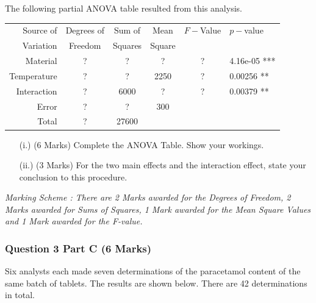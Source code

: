 \documentclass[a4paper,12pt]{article}
\begin{document}
%
\bigskip 


\noindent The following partial ANOVA table resulted from this analysis.
%
\begin{center}
\begin{tabular}{|r||c|c|c|c|l|}\hline
	Source of & Degrees of &Sum of  & Mean &$F-$Value& $p-$value\\
	
	Variation & Freedom  &  Squares & Square&&\\ \hline 
	

Material	&	\phantom{ma} ? \phantom{ma}	&	\phantom{ma} ? \phantom{ma}	&	\phantom{ma} ? \phantom{ma}	&	\phantom{ma} ? \phantom{ma}	&	4.16e-05 ***	\\ \hline
Temperature	&	\phantom{ma} ? \phantom{ma}	&	\phantom{ma} ? \phantom{ma}	&	2250	&	\phantom{ma} ? \phantom{ma}	&	0.00256 **	\\ \hline
Interaction	&	\phantom{ma} ? \phantom{ma}	&	6000	&	\phantom{ma} ? \phantom{ma}	&	\phantom{ma} ? \phantom{ma}	&	0.00379 **	\\ \hline
Error	&	\phantom{ma} ? \phantom{ma}	&	\phantom{ma} ? \phantom{ma}	&	300	&		&	 	\\ \hline \hline
Total	&	\phantom{ma} ? \phantom{ma}	&	27600	&		&		&		\\ \hline

\end{tabular} 
\end{center}
\begin{itemize}
\item[(i.)] (6 Marks) Complete the ANOVA Table. Show your workings.

\item[(ii.)] (3 Marks) For the two main effects and the interaction effect, state your conclusion to this procedure.
\end{itemize}

\bigskip 
\noindent \textit{Marking Scheme : There are 2 Marks awarded for the Degrees of Freedom, 2 Marks awarded for Sums of Squares, 1 Mark awarded for the Mean Square Values and 1 Mark awarded for the F-value.}


\newpage
\subsubsection*{Question 3 Part C (6 Marks)}
Six analysts each made seven determinations of the paracetamol content of the same batch of tablets.
The results are shown below. There are 42 determinations in total. 
\end{document}
